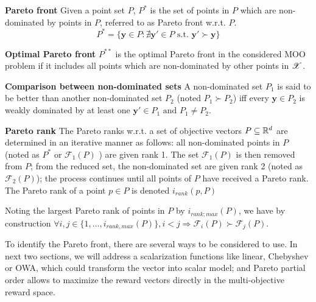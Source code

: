 \begin{dfn}
\textbf{Pareto front} Given a point set $P$, $P^{\ast}$ is the set of points in $P$ which are non-dominated by points in $P$, referred to as Pareto front w.r.t. $P$.
\[P^{\ast} = \{\mathbf{y}\in P: \nexists \mathbf{y}'\in P \text{ s.t. }\mathbf{y}'\succ\mathbf{y}\}\]
\end{dfn}

\begin{dfn}
\textbf{Optimal Pareto front} $P^{\ast\ast}$ is the optimal Pareto front in the considered MOO problem if it includes all points which are non-dominated by other points in $\mathscr{X}$.
\end{dfn}
\begin{dfn}
\textbf{Comparison between non-dominated sets} A non-dominated set $P_1$ is said to be better than another non-dominated set $P_2$ (noted $P_1 \succ P_2$) iff every $\mathbf{y}\in P_2$ is weakly dominated by at least one $\mathbf{y}'\in P_1 \text{ and } P_1\neq P_2$.
\end{dfn}
\begin{dfn}\textbf{Pareto rank}
The Pareto ranks w.r.t. a set of objective vectors $P\subseteq \mathbb{R}^d$ are determined in an iterative manner as follows: all non-dominated points in $P$ (noted as $P^{\ast}$ or $\mathscr{F}_1(P)$ ) are given rank 1. The set $\mathscr{F}_1(P)$ is then removed from $P$; from the reduced set, the non-dominated set are given rank 2 (noted as $\mathscr{F}_2(P)$); the process continues until all points of $P$ have received a Pareto rank. The Pareto rank of a point $p\in P$ is denoted $i_{rank}(p,P)$
\end{dfn}

Noting the largest Pareto rank of points in $P$ by $i_{rank;max}(P)$, we have by construction $\forall i,j \in \{1,\dots, i_{rank,max}(P)\}, i<j \Rightarrow \mathscr{F}_i(P)\succ \mathscr{F}_j(P)$.

To identify the Pareto front, there are several ways to be considered to use. In next two sections, we will address a scalarization functions like linear, Chebyshev\cite{miettinen2012nonlinear} or OWA\cite{yager1988ordered}, which could transform the vector into scalar model; and Pareto partial order \cite{zitzler2003performance} allows to maximize the reward vectors directly in the multi-objective reward space.